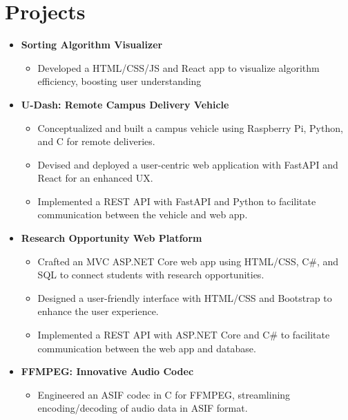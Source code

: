 \documentclass[letterpaper,11pt]{article}
\begin{document}
\section{\textbf{Projects}}
\begin{itemize}[leftmargin=0.15in, itemsep=0pt, parsep=0pt, label={}]
	\item{
	            \textbf{Sorting Algorithm Visualizer}
	            \begin{itemize} [label=$\bullet$]
		            \item{Developed a HTML/CSS/JS and React app to visualize algorithm efficiency, boosting user understanding}
	            \end{itemize}
	      }
	\item{
	            \textbf{U-Dash: Remote Campus Delivery Vehicle}
	            \begin{itemize} [label=$\bullet$]
		            \item{Conceptualized and built a campus vehicle using Raspberry Pi, Python, and C for remote deliveries.}
		            \item{Devised and deployed a user-centric web application with FastAPI and React for an enhanced UX.}
		            \item{Implemented a REST API with FastAPI and Python to facilitate communication between the vehicle and web app.}
	            \end{itemize}
	      }
	\item{
	            \textbf{Research Opportunity Web Platform}
	            \begin{itemize} [label=$\bullet$]
		            \item{Crafted an MVC ASP.NET Core web app using HTML/CSS, C\#, and SQL to connect students with research opportunities.}
		            \item{Designed a user-friendly interface with HTML/CSS and Bootstrap to enhance the user experience.}
		            \item{Implemented a REST API with ASP.NET Core and C\# to facilitate communication between the web app and database.}
	            \end{itemize}
	      }
	\item{
	            \textbf{FFMPEG: Innovative Audio Codec}
	            \begin{itemize} [label=$\bullet$]
		            \item{Engineered an ASIF codec in C for FFMPEG, streamlining encoding/decoding of audio data in ASIF format.}
	            \end{itemize}
	      }

\end{itemize}
\end{document}
